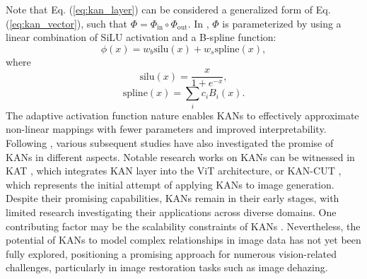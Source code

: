 Note that Eq. (\ref{eq:kan_layer}) can be considered a generalized form of Eq. (\ref{eq:kan_vector}), such that $\Phi = \Phi_{\text{in}}\circ \Phi_{\text{out}}$. In \cite{liu2024kan}, $\Phi$ is parameterized by using a linear combination of SiLU activation \cite{elfwing2018sigmoid} and a B-spline function:
\begin{equation}
        \phi(x) = w_b \mathrm{silu}(x) + w_s \mathrm{spline}(x),
\end{equation}
where
\begin{equation}
\mathrm{silu}(x) = \frac{x}{1+e^{-x}}, 
\end{equation}
\begin{equation}
\mathrm{spline}(x)=\sum_i c_i B_i(x).
\end{equation}
The adaptive activation function nature enables KANs to effectively approximate non-linear mappings with fewer parameters and improved interpretability. Following \cite{liu2024kan}, various subsequent studies have also investigated the promise of KANs in different aspects. Notable research works on KANs can be witnessed in KAT \cite{yang2024kolmogorov}, which integrates KAN layer into the ViT architecture, or KAN-CUT \cite{mahara2024dawn}, which represents the initial attempt of applying KANs to image generation. Despite their promising capabilities, KANs remain in their early stages, with limited research investigating their applications across diverse domains. One contributing factor may be the scalability constraints of KANs \cite{yang2024kolmogorov}. Nevertheless, the potential of KANs to model complex relationships in image data has not yet been fully explored, positioning a promising approach for numerous vision-related challenges, particularly in image restoration tasks such as image dehazing.


